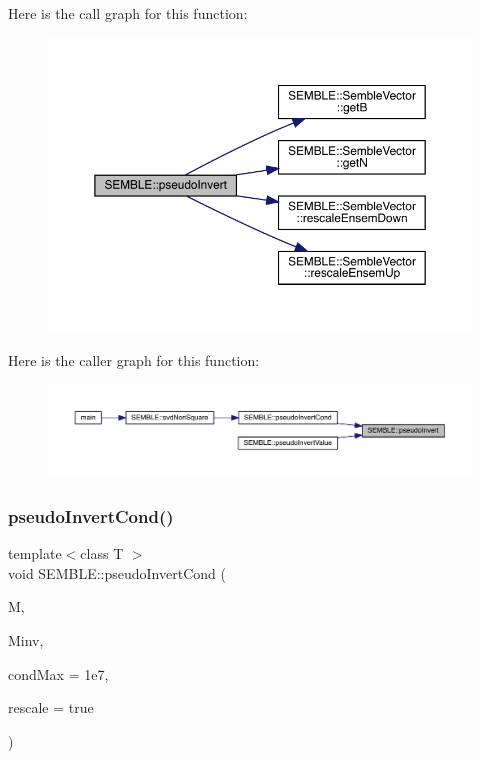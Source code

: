 Here is the call graph for this function\+:
\nopagebreak
\begin{figure}[H]
\begin{center}
\leavevmode
\includegraphics[width=350pt]{d7/dfd/namespaceSEMBLE_aea218466ee1ef3d98f79fcd3cf6d0c49_cgraph}
\end{center}
\end{figure}
Here is the caller graph for this function\+:
\nopagebreak
\begin{figure}[H]
\begin{center}
\leavevmode
\includegraphics[width=350pt]{d7/dfd/namespaceSEMBLE_aea218466ee1ef3d98f79fcd3cf6d0c49_icgraph}
\end{center}
\end{figure}
\mbox{\label{namespaceSEMBLE_ad26b9b7468ab7482dfcd5909c46358cf}} 
\subsubsection{\texorpdfstring{pseudoInvertCond()}{pseudoInvertCond()}}
{\footnotesize\ttfamily template$<$class T $>$ \\
void S\+E\+M\+B\+L\+E\+::pseudo\+Invert\+Cond (\begin{DoxyParamCaption}\item[{const \mbox{\hyperlink{structSEMBLE_1_1SembleMatrix}{Semble\+Matrix}}$<$ T $>$ \&}]{M,  }\item[{\mbox{\hyperlink{structSEMBLE_1_1SembleMatrix}{Semble\+Matrix}}$<$ T $>$ \&}]{Minv,  }\item[{double}]{cond\+Max = {\ttfamily 1e7},  }\item[{bool}]{rescale = {\ttfamily true} }\end{DoxyParamCaption})}


